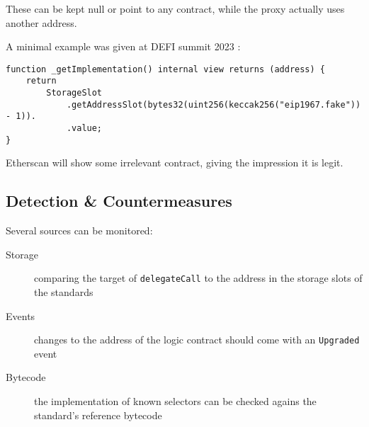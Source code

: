 These can be kept null or point to any contract, while the proxy actually uses another address.

A minimal example was given at DEFI summit 2023 \cite{video-masquerading-code}:

\begin{lstlisting}[language=Solidity]
function _getImplementation() internal view returns (address) {
    return
        StorageSlot
            .getAddressSlot(bytes32(uint256(keccak256("eip1967.fake")) - 1)).
            .value;
}
\end{lstlisting}

Etherscan will show some irrelevant contract, giving the impression it is legit.

\subsection{Detection \& Countermeasures}

Several sources can be monitored:

\begin{description}
\item[Storage]{comparing the target of \lstinline[language=Solidity]{delegateCall} to the address in the storage slots of the standards}
\item[Events]{changes to the address of the logic contract should come with an \lstinline[language=Solidity]{Upgraded} event}
\item[Bytecode]{the implementation of known selectors can be checked agains the standard's reference bytecode}
\end{description}

